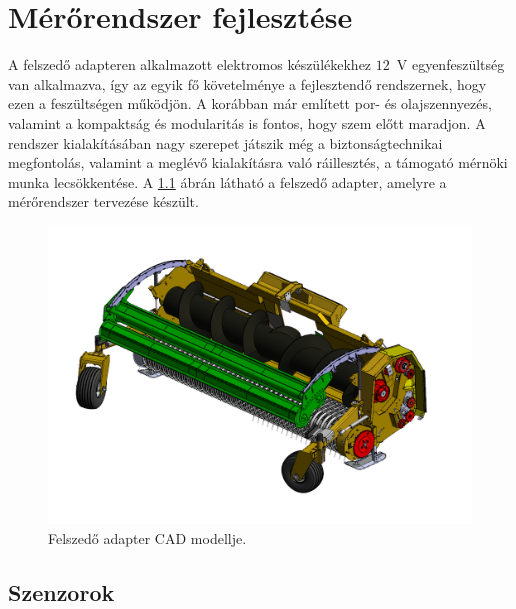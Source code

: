 \chapter{Mérőrendszer fejlesztése}
\label{sec:Fejleszt}


A felszedő adapteren alkalmazott elektromos készülékekhez $12$~V egyenfeszültség van alkalmazva, így az egyik fő követelménye a fejlesztendő rendszernek, hogy ezen a feszültségen működjön. A korábban már említett por- és olajszennyezés, valamint a kompaktság és modularitás is fontos, hogy szem előtt maradjon. A rendszer kialakításában nagy szerepet játszik még a biztonságtechnikai megfontolás, valamint a meglévő kialakításra való ráillesztés, a támogató mérnöki munka lecsökkentése. A \ref{felszedo_adapter} ábrán látható a felszedő adapter, amelyre a mérőrendszer tervezése készült.
\begin{figure}
	\centering
	\includegraphics[width=\columnwidth*5/10]{figures/egesz_adapter.png}
	\caption{Felszedő adapter CAD modellje.}
	\label{felszedo_adapter}
\end{figure}

\section{Szenzorok}

